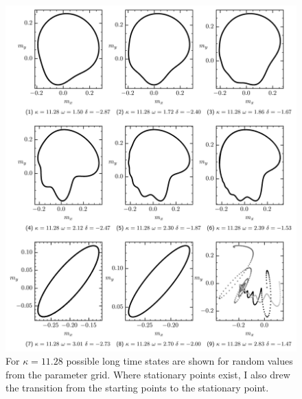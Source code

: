 \begin{appendices}
    \begin{figure}[H]
        \hspace*{-1cm}
        \includegraphics{pictures/lc_traj_kcut2.png}
        \caption{For $\kappa=11.28$ possible long time states are shown for random values from the parameter grid. Where stationary points exist, I also drew the transition from the starting points to the stationary point.}
    \end{figure}
    

\end{appendices}
